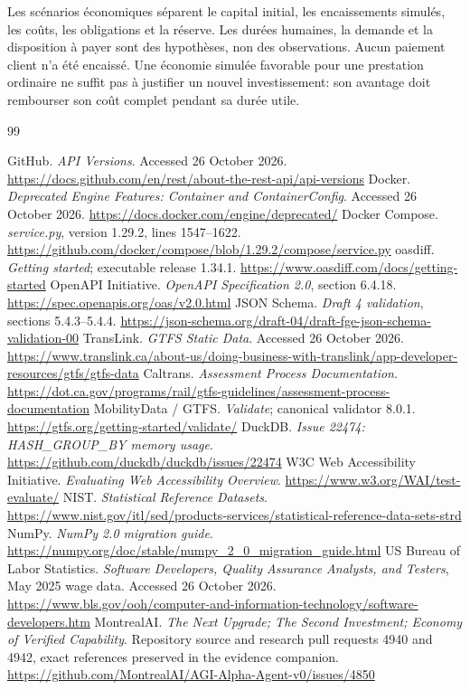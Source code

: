 \documentclass[11pt,letterpaper]{article}
\begin{document}
Les scénarios économiques séparent le capital initial, les encaissements simulés, les coûts,
les obligations et la réserve. Les durées humaines, la demande et la disposition à payer
sont des hypothèses, non des observations. Aucun paiement client n'a été encaissé. Une
économie simulée favorable pour une prestation ordinaire ne suffit pas à justifier un nouvel
investissement: son avantage doit rembourser son coût complet pendant sa durée utile.

\begin{thebibliography}{99}\small\raggedright
{} GitHub. \emph{API Versions}. Accessed 26 October 2026.
\url{https://docs.github.com/en/rest/about-the-rest-api/api-versions}
 Docker. \emph{Deprecated Engine Features: Container and ContainerConfig}.
Accessed 26 October 2026. \url{https://docs.docker.com/engine/deprecated/}
 Docker Compose. \emph{service.py}, version 1.29.2, lines 1547--1622.
\url{https://github.com/docker/compose/blob/1.29.2/compose/service.py}
 oasdiff. \emph{Getting started}; executable release 1.34.1.
\url{https://www.oasdiff.com/docs/getting-started}
 OpenAPI Initiative. \emph{OpenAPI Specification 2.0}, section 6.4.18.
\url{https://spec.openapis.org/oas/v2.0.html}
 JSON Schema. \emph{Draft 4 validation}, sections 5.4.3--5.4.4.
\url{https://json-schema.org/draft-04/draft-fge-json-schema-validation-00}
 TransLink. \emph{GTFS Static Data}. Accessed 26 October 2026.
\url{https://www.translink.ca/about-us/doing-business-with-translink/app-developer-resources/gtfs/gtfs-data}
 Caltrans. \emph{Assessment Process Documentation}.
\url{https://dot.ca.gov/programs/rail/gtfs-guidelines/assessment-process-documentation}
 MobilityData / GTFS. \emph{Validate}; canonical validator 8.0.1.
\url{https://gtfs.org/getting-started/validate/}
 DuckDB. \emph{Issue 22474: HASH\_GROUP\_BY memory usage}.
\url{https://github.com/duckdb/duckdb/issues/22474}
 W3C Web Accessibility Initiative. \emph{Evaluating Web Accessibility Overview}.
\url{https://www.w3.org/WAI/test-evaluate/}
 NIST. \emph{Statistical Reference Datasets}.
\url{https://www.nist.gov/itl/sed/products-services/statistical-reference-data-sets-strd}
 NumPy. \emph{NumPy 2.0 migration guide}.
\url{https://numpy.org/doc/stable/numpy_2_0_migration_guide.html}
 US Bureau of Labor Statistics. \emph{Software Developers, Quality Assurance Analysts,
and Testers}, May 2025 wage data. Accessed 26 October 2026.
\url{https://www.bls.gov/ooh/computer-and-information-technology/software-developers.htm}
 MontrealAI. \emph{The Next Upgrade; The Second Investment; Economy of Verified
Capability}. Repository source and research pull requests 4940 and 4942, exact references
preserved in the evidence companion.
\url{https://github.com/MontrealAI/AGI-Alpha-Agent-v0/issues/4850}
\end{thebibliography}
\end{document}
